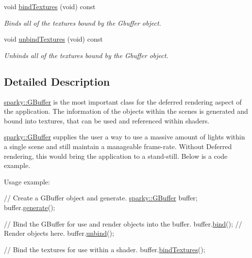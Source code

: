 \begin{DoxyCompactItemize}
void \hyperlink{classsparky_1_1_g_buffer_a93c184529fb8fb27a24b39762e948322}{bind\+Textures} (void) const 
\begin{DoxyCompactList}\small\item\em Binds all of the textures bound by the Gbuffer object. \end{DoxyCompactList}\item 
void \hyperlink{classsparky_1_1_g_buffer_a00610bd1aedcefc174d70f016eedf107}{unbind\+Textures} (void) const 
\begin{DoxyCompactList}\small\item\em Unbinds all of the textures bound by the Gbuffer object. \end{DoxyCompactList}\end{DoxyCompactItemize}


\subsection{Detailed Description}
\hyperlink{classsparky_1_1_g_buffer}{sparky\+::\+G\+Buffer} is the most important class for the deferred rendering aspect of the application. The information of the objects within the scenes is generated and bound into textures, that can be used and referenced within shaders.

\hyperlink{classsparky_1_1_g_buffer}{sparky\+::\+G\+Buffer} supplies the user a way to use a massive amount of lights within a single scene and still maintain a manageable frame-\/rate. Without Deferred rendering, this would bring the application to a stand-\/still. Below is a code example.

Usage example\+: 
\begin{DoxyCode}
\textcolor{comment}{// Create a GBuffer object and generate.}
\hyperlink{classsparky_1_1_g_buffer}{sparky::GBuffer} buffer;
buffer.\hyperlink{classsparky_1_1_g_buffer_a71c5f2a4dc35f05a3e978fa20ba4564f}{generate}();

\textcolor{comment}{// Bind the GBuffer for use and render objects into the buffer.}
buffer.\hyperlink{classsparky_1_1_g_buffer_a832f461bb679e535dbd4a23f583192bf}{bind}();
\textcolor{comment}{// Render objects here.}
buffer.\hyperlink{classsparky_1_1_g_buffer_a5bac7c40c04e0a558387509b1dda46fa}{unbind}();

\textcolor{comment}{// Bind the textures for use within a shader.}
buffer.\hyperlink{classsparky_1_1_g_buffer_a93c184529fb8fb27a24b39762e948322}{bindTextures}();
\end{DoxyCode}
 

